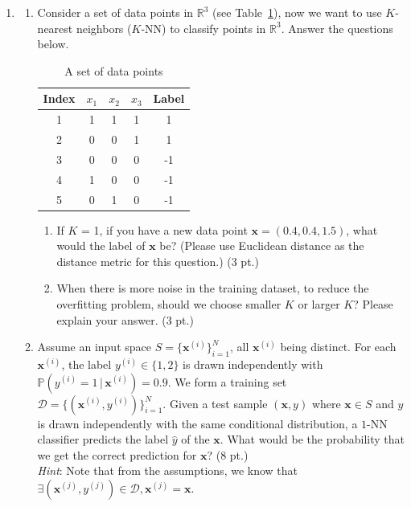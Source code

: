 \documentclass{article}
\newcommand{\bx}{{\boldsymbol x}}
\theoremstyle{definition}
\theoremstyle{remark}
\newenvironment{Q}
        {%
          \clearpage
          \item
        }
        {%
          \phantom{s} 
          \bigskip
        }
\begin{document}
\begin{enumerate}[font={\Large\bfseries},left=0pt]
\begin{Q}
\begin{enumerate}
 

    \item 
    Consider a set of data points in $\mathbb{R}^3$ (see Table~\ref{tab:perceptron})\label{}, now we want to use $K$-nearest neighbors ($K$-NN) to classify points in $\mathbb{R}^3$. Answer the questions below.
    \begin{table}[!htb]
            \centering
            \begin{tabular}{|c|c|c|c|c|}
                \hline
                \textbf{Index} & \textbf{$x_1$} & \textbf{$x_2$} & \textbf{$x_3$} & \textbf{Label} \\
                \hline
                1 & 1 & 1 & 1 & 1\\
                \hline
                2 & 0 & 0 & 1 & 1\\
                \hline
                3 & 0 & 0 & 0 & -1\\
                \hline
                4 & 1 & 0 & 0 & -1\\
                \hline
                5 & 0 & 1 & 0 & -1\\
                \hline
            \end{tabular}
            \caption{A set of data points}
            \label{tab:perceptron}
        \end{table}
    \begin{enumerate}
        \item If $K$ = 1, if you have a new data point $\bm{x} = (0.4, 0.4, 1.5)$, what would the label of $\bm{x}$ be? (Please use Euclidean distance as the distance metric for this question.) (3 pt.)

        \item When there is more noise in the training dataset, to reduce the overfitting problem, should we choose smaller $K$ or larger $K$? Please explain your answer. (3 pt.)

    \end{enumerate}
\item
 Assume an input space \(S=\{\bx^{(i)}\}_{i=1}^N\), all $\bx^{(i)}$ being distinct. For each \(\bx^{(i)}\),
the label \(y^{(i)}\in\{1,2\}\) is drawn independently with
\(\mathbb{P}(y^{(i)}=1\,|\,\bx^{(i)})=0.9\).
We form a training set \(\mathcal D=\{(\bx^{(i)},y^{(i)})\}_{i=1}^N\).
Given a test sample \((\bx,y)\) where \(\bx\in S\) and \(y\) is drawn independently with the same conditional distribution, a \(1\)-NN classifier predicts the label $\hat{y}$ of the \(\bx\).
 What would be the probability that we get the correct prediction for $\bx$?
  (8 pt.)\\
 \textit{Hint}: Note that from the assumptions, we know that $\exists (\bx^{(j)}, y^{(j)}) \in \mathcal{D}, \bx^{(j)} = \bx$.




\end{enumerate}
\end{Q}
\end{enumerate}
\end{document}
